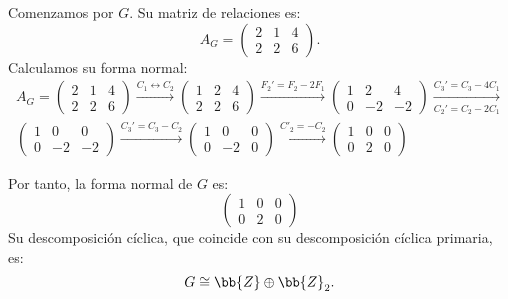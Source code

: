 \begin{ejercicio}
\begin{enumerate}
        Comenzamos por $G$. Su matriz de relaciones es:
        \begin{equation*}
            A_G = \begin{pmatrix}
                2 & 1 & 4 \\
                2 & 2 & 6
            \end{pmatrix}.
        \end{equation*}
        Calculamos su forma normal:
        \begin{multline*}
            A_G = \begin{pmatrix}
                2 & 1 & 4 \\
                2 & 2 & 6
            \end{pmatrix}
            \xrightarrow{C_1\leftrightarrow C_2}
            \begin{pmatrix}
                1 & 2 & 4\\
                2 & 2 & 6
            \end{pmatrix}
            \xrightarrow{F_2'=F_2-2F_1}
            \begin{pmatrix}
                1 & 2 & 4\\
                0 & -2 & -2
            \end{pmatrix}
            \xrightarrow[C_2'=C_2-2C_1]{C_3'=C_3-4C_1}\\
            \begin{pmatrix}
                1 & 0 & 0 \\
                0 & -2 & -2
            \end{pmatrix}
            \xrightarrow{C_3'=C_3-C_2}
            \begin{pmatrix}
                1 & 0 & 0 \\
                0 & -2 & 0
            \end{pmatrix}
            \xrightarrow{C'_2=-C_2}
            \begin{pmatrix}
                1 & 0 & 0 \\
                0 & 2 & 0
            \end{pmatrix}
        \end{multline*}

        Por tanto, la forma normal de $G$ es:
        \begin{equation*}
            \begin{pmatrix}
                1 & 0 & 0 \\
                0 & 2 & 0
            \end{pmatrix}
        \end{equation*}
        Su descomposición cíclica, que coincide con su descomposición cíclica primaria, es:
        \begin{equation*}
            G \cong \bb{Z} \oplus \bb{Z}_2.
        \end{equation*}


\end{enumerate}
\end{ejercicio}
